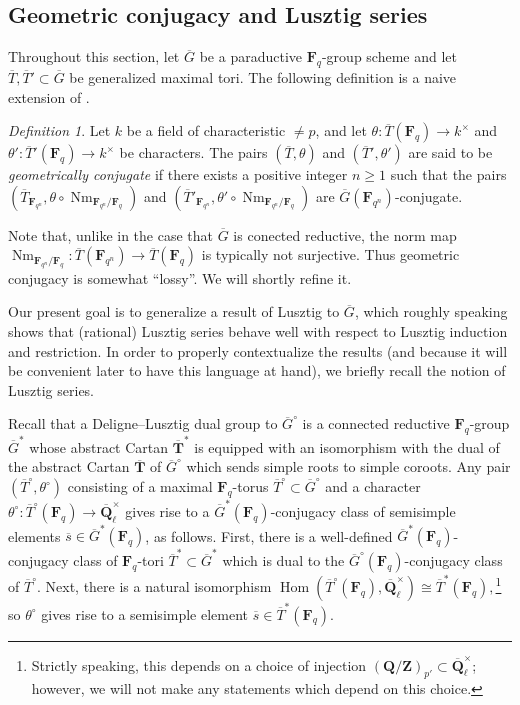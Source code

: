 \documentclass[reqno]{amsart}
\numberwithin{equation}{subsection}
\newcommand{\F}{\mathbf{F}}
\newcommand{\Q}{\mathbf{Q}}
\newcommand{\Z}{\mathbf{Z}}
\newcommand{\ol}[1]{\overline{#1}}
\newcommand{\co}{\colon}
\DeclareMathOperator{\Hom}{Hom}
\DeclareMathOperator{\Nm}{Nm}
\newcommand{\bT}{\mathbf{T}}
\theoremstyle{remark}
\newtheorem{defn}[thm]{Definition}
\numberwithin{equation}{subsection}
\numberwithin{figure}{subsection}
\begin{document}
\subsection{Geometric conjugacy and Lusztig series}\label{sss:geom-conj}

Throughout this section, let $\ol G$ be a paraductive $\F_q$-group scheme and let $\ol T, \ol T' \subset \ol G$ be generalized maximal tori. The following definition is a naive extension of \cite[Definition 5.5]{DL76}.

\begin{defn}\label{def:geom-conj}
    Let $k$ be a field of characteristic $\neq p$, and let $\theta\co \ol T(\F_q) \to k^\times$ and $\theta'\co \ol T'(\F_q) \to k^\times$ be characters. The pairs $(\ol T, \theta)$ and $(\ol T',\theta')$ are said to be \textit{geometrically conjugate} if there exists a positive integer $n \geq 1$ such that the pairs $(\ol T_{\F_{q^n}}, \theta \circ \Nm_{\F_{q^n}/\F_q})$ and $(\ol T'_{\F_{q^n}}, \theta' \circ \Nm_{\F_{q^n}/\F_q})$ are $\ol G(\F_{q^n})$-conjugate.
\end{defn}

Note that, unlike in the case that $\ol G$ is conected reductive, the norm map $\Nm_{\F_{q^n}/\F_q}\co \ol T(\F_{q^n}) \to \ol T(\F_q)$ is typically not surjective. Thus geometric conjugacy is somewhat ``lossy''. We will shortly refine it.

Our present goal is to generalize a result of Lusztig \cite[Corollaire~11.11]{Bon06} to $\ol G$, which roughly speaking shows that (rational) Lusztig series behave well with respect to Lusztig induction and restriction. In order to properly contextualize the results (and because it will be convenient later to have this language at hand), we briefly recall the notion of Lusztig series.

Recall \cite[Definition 5.21]{DL76} that a Deligne--Lusztig dual group to $\ol G^\circ$ is a connected reductive $\F_q$-group $\ol G^*$ whose abstract Cartan $\ol \bT^*$ is equipped with an isomorphism with the dual of the abstract Cartan $\ol \bT$ of $\ol G^\circ$ which sends simple roots to simple coroots. Any pair $(\ol T^\circ, \theta^\circ)$ consisting of a maximal $\F_q$-torus $\ol T^\circ \subset \ol G^\circ$ and a character $\theta^\circ\co \ol T^\circ(\F_q) \to \ol\Q_\ell^\times$ gives rise to a $\ol G^*(\F_q)$-conjugacy class of semisimple elements $\ol s \in \ol G^*(\F_q)$, as follows. First, there is a well-defined $\ol G^*(\F_q)$-conjugacy class of $\F_q$-tori $\ol T^* \subset \ol G^*$ which is dual to the $\ol G^\circ(\F_q)$-conjugacy class of $\ol T^\circ$. Next, there is a natural isomorphism $\Hom(\ol T^\circ(\F_q), \ol\Q_\ell^\times) \cong \ol T^*(\F_q),$\footnote{Strictly speaking, this depends on a choice of injection $(\Q/\Z)_{p'} \subset \ol\Q_\ell^\times$; however, we will not make any statements which depend on this choice.} so $\theta^\circ$ gives rise to a semisimple element $\ol s \in \ol T^*(\F_q)$.
\end{document}
